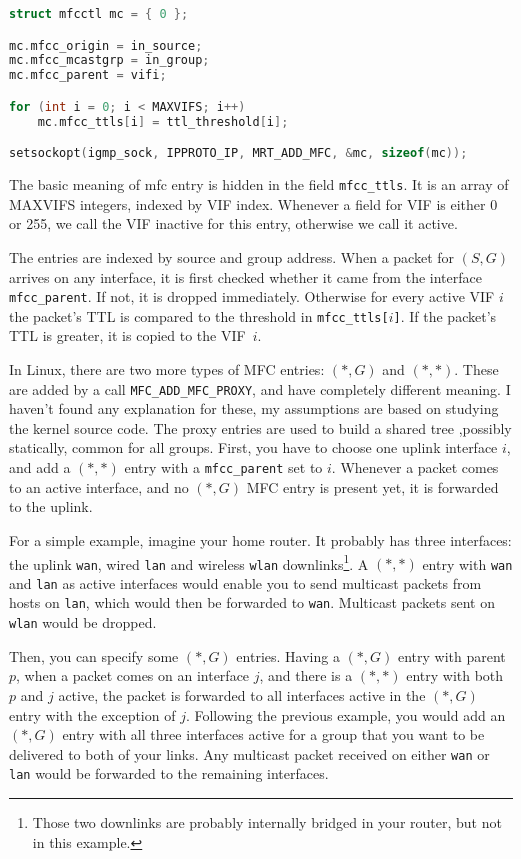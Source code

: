 \begin{lstlisting}[language=c]
struct mfcctl mc = { 0 };

mc.mfcc_origin = in_source;
mc.mfcc_mcastgrp = in_group;
mc.mfcc_parent = vifi;

for (int i = 0; i < MAXVIFS; i++)
    mc.mfcc_ttls[i] = ttl_threshold[i];

setsockopt(igmp_sock, IPPROTO_IP, MRT_ADD_MFC, &mc, sizeof(mc));
\end{lstlisting}

The basic meaning of mfc entry is hidden in the field \texttt{mfcc\_ttls}. It is
an array of MAXVIFS integers, indexed by VIF index. Whenever a field for VIF is
either 0 or 255, we call the VIF inactive for this entry, otherwise we call it
active.

The entries are indexed by source and group address. When a packet for $(S,G)$
arrives on any interface, it is first checked whether it came from the
interface \texttt{mfcc\_parent}. If not, it is dropped immediately. Otherwise
for every active VIF $i$ the packet's TTL is compared to the threshold in
\texttt{mfcc\_ttls[$i$]}. If the packet's TTL is greater, it is copied to the
VIF~$i$.

In Linux, there are two more types of MFC entries: $(*,G)$ and $(*,*)$. These
are added by a call \texttt{MFC\_ADD\_MFC\_PROXY}, and have completely different
meaning. I haven't found any explanation for these, my assumptions are based on
studying the kernel source code. The proxy entries are used to build a shared
tree ,possibly statically, common for all groups. First, you have to choose one
uplink interface $i$, and add a $(*,*)$ entry with a \texttt{mfcc\_parent} set
to $i$. Whenever a packet comes to an active interface, and no $(*, G)$ MFC
entry is present yet, it is forwarded to the uplink.

For a simple example, imagine your home router. It probably has three
interfaces: the uplink \texttt{wan}, wired \texttt{lan} and wireless
\texttt{wlan} downlinks\footnote{Those two downlinks are probably internally
bridged in your router, but not in this example.}. A $(*,*)$ entry with
\texttt{wan} and \texttt{lan} as active interfaces would enable you to send
multicast packets from hosts on \texttt{lan}, which would then be forwarded to
\texttt{wan}. Multicast packets sent on \texttt{wlan} would be dropped.

Then, you can specify some $(*,G)$ entries. Having a $(*,G)$ entry with parent
$p$, when a packet comes on an interface $j$, and there is a $(*,*)$ entry with
both $p$ and $j$ active, the packet is forwarded to all interfaces active in
the $(*,G)$ entry with the exception of $j$. Following the previous example,
you would add an $(*,G)$ entry with all three interfaces active for a group
that you want to be delivered to both of your links. Any multicast packet
received on either \texttt{wan} or \texttt{lan} would be forwarded to the
remaining interfaces.

